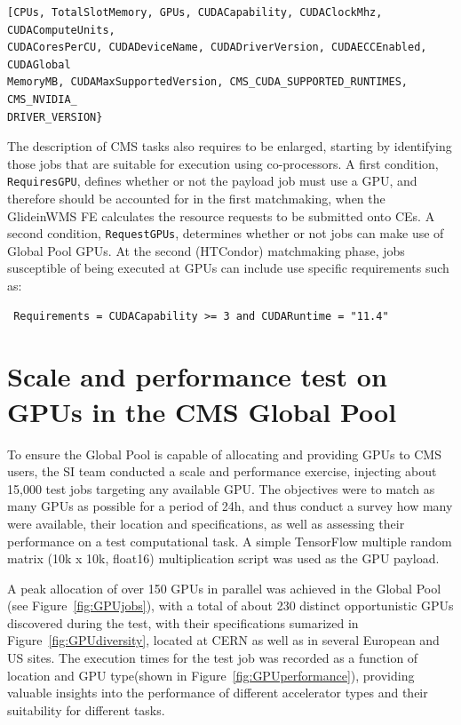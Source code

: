 \documentclass[a4paper]{jpconf}
\begin{document}
\begin{verbatim}[CPUs, TotalSlotMemory, GPUs, CUDACapability, CUDAClockMhz, CUDAComputeUnits, 
CUDACoresPerCU, CUDADeviceName, CUDADriverVersion, CUDAECCEnabled, CUDAGlobal
MemoryMB, CUDAMaxSupportedVersion, CMS_CUDA_SUPPORTED_RUNTIMES, CMS_NVIDIA_
DRIVER_VERSION}\end{verbatim}

The description of CMS tasks also requires to be enlarged, starting by identifying those jobs that are suitable for execution using co-processors. A first condition, \verb|RequiresGPU|, defines whether or not the payload job must use a GPU, and therefore should be accounted for in the first matchmaking, when the GlideinWMS FE calculates the resource requests to be submitted onto CEs. A second condition, \verb|RequestGPUs|, determines whether or not jobs can make use of Global Pool GPUs. At the second (HTCondor) matchmaking phase, jobs susceptible of being executed at GPUs can include use specific requirements such as: 
\begin{verbatim} Requirements = CUDACapability >= 3 and CUDARuntime = "11.4"\end{verbatim}



\section{Scale and performance test on GPUs in the CMS Global Pool}\label{sec:test}
To ensure the Global Pool is capable of allocating and providing GPUs to CMS users, the SI team conducted a scale and performance exercise, injecting about 15,000 test jobs targeting any available GPU. The objectives were to match as many GPUs as possible for a period of 24h, and thus conduct a survey how many were available, their location and specifications, as well as assessing their performance on a test computational task. A simple TensorFlow multiple random matrix (10k x 10k, float16) multiplication script was used as the GPU payload. 

A peak allocation of over 150 GPUs in parallel was achieved in the Global Pool (see Figure~\ref{fig:GPUjobs}), with a total of about 230 distinct opportunistic GPUs discovered during the test, with their specifications sumarized in Figure~\ref{fig:GPUdiversity}, located at CERN as well as in several European and US sites. The execution times for the test job was recorded as a function of location and GPU type(shown in Figure~\ref{fig:GPUperformance}), providing valuable insights into the performance of different accelerator types and their suitability for different tasks.
\end{document}
